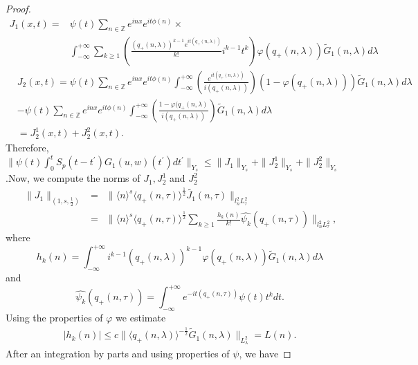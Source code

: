 \documentclass[reqno]{amsart}
\numberwithin{equation}{section}
\begin{document}
\begin{proof}
\begin{equation*}
\begin{split}
J_1(x,t) =&\psi(t)\sum\limits_{n\in\mathbb{Z}}e^{inx}e^{it\phi(n)}\times\\
&\int_{-\infty}^{+\infty}\sum\limits_{k\geq1}\left(\frac{(q_{+}(n,\lambda))^{k-1}
e^{it\left(q_{+}(n,\lambda)\right)  }}{k!}i^{k-1}t^{k}\right)
\varphi(q_{+}(n,\lambda))\widetilde{G}_{1}(n,\lambda) d\lambda
\end{split}
\end{equation*}
\begin{equation}\label{4.12}
\begin{split}
&J_{2}(x,t) =\psi(t)\sum\limits_{n\in\mathbb{Z}}e^{inx}e^{it\phi(n)}
\int_{-\infty}^{+\infty}\left( \frac{e^{it\left(
q_{+}(n,\lambda)\right)  }}{i(q_{+}(n,\lambda))}\right) \left(
1-\varphi(q_{+}(n,\lambda))\right)  \widetilde{G}_{1}(n,\lambda
)d\lambda\\
&  -\psi(t)\sum\limits_{n\in\mathbb{Z}}e^{inx}e^{it\phi(n)}\int_{-\infty}^{+\infty}
\left(\frac{1-\varphi(q_{+}(n,\lambda)}{i(q_{+}(n,\lambda))}\right)
\widetilde{G}_1(n,\lambda)d\lambda\\
&=J_{2}^{1}(x,t)+J_{2}^{2}(x,t).
\end{split}
\end{equation}
Therefore, $\| \psi(t)\int\nolimits_{0}^{t}S_{p}(t-t^{\prime})G_{1}(u,w)(t^{\prime})dt^{\prime}\|
_{Y_{s}}\leq\| J_{1}\| _{Y_{s}}+\|
J_{2}^{1}\| _{Y_{s}}+\| J_{2}^{2}\|
_{Y_{s}}$.\newline Now, we compute the norms of $ J_{1}, J_{2}^{1}$ and
$J_{2}^{2}$
\begin{eqnarray}\label{4.13}
\| J_{1}\| _{(1,s,\frac12)}  &=& \| \langle n\rangle^{s}\langle
q_{+}(n,\tau)\rangle^{\frac
{1}{2}}\widetilde{J_{1}}(n,\tau)\| _{l_{n}^{2}L_{\tau}^{2}}\nonumber \\
&=& \| \langle n\rangle^{s}\langle q_{+}(n,\tau)\rangle^{\frac{1}{2}}\sum\limits_{k\geq1}\frac{h_{k}(n)}{k!}\widehat{\psi_{k}}(q_{+}(n,\tau))\| _{l_{n}^{2}L_{\tau}^{2}}\text{,}
\end{eqnarray}
where
\[
h_{k}(n)=\int_{-\infty}^{+\infty}i^{k-1}(q_{+}(n,\lambda))^{k-1}\varphi
(q_{+}(n,\lambda))\widetilde{G}_{1}(n,\lambda)d\lambda
\]
and
\[
\widehat{\psi_{k}}(q_{+}(n,\tau))=\int_{-\infty}^{+\infty}e^{-it\left(
q_{+}(n,\tau)\right)  }\psi(t)t^{k}dt\text{.}
\]
Using the properties of $\varphi$ we estimate
\begin{align}\label{4.15}
|h_{k}(n)|\leq c\| \langle q_{+}(n,\lambda)\rangle^{-\frac{1}{2}}
\widetilde{G}_{1}(n,\lambda)\|_{L_{\lambda}^{2}} =L(n).
\end{align}
After an integration by parts and using properties of $\psi$, we have


\end{proof}
\end{document}
